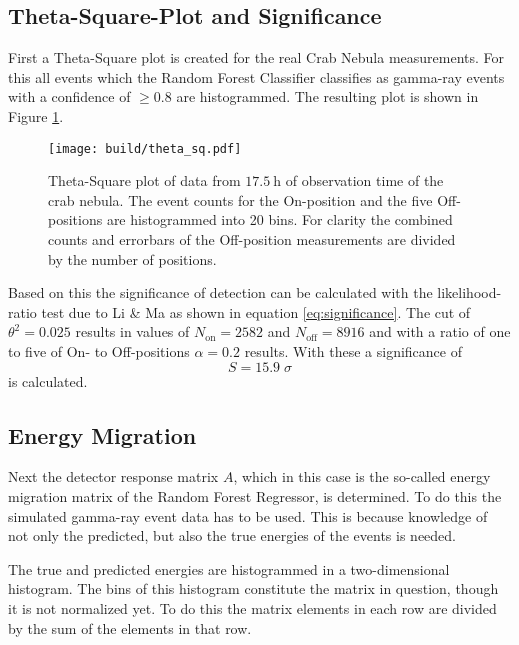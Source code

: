         \subsection{Theta-Square-Plot and Significance}
            First a Theta-Square plot is created for the real Crab Nebula measurements.
            For this all events which the Random Forest Classifier classifies as gamma-ray events with a confidence of $\geq \num{0.8}$ are histogrammed.
            The resulting plot is shown in Figure \ref{fig:theta_sq}.
            \begin{figure}
                \centering
                \texttt{[image: build/theta\_sq.pdf]}
                \caption{
                    Theta-Square plot of data from $\SI{17.5}{\hour}$ of observation time of the crab nebula.
                    The event counts for the On-position and the five Off-positions are histogrammed into 20 bins.
                    For clarity the combined counts and errorbars of the Off-position measurements are divided by the number of positions.
                }
                \label{fig:theta_sq}
            \end{figure}
            
            Based on this the significance of detection can be calculated with the likelihood-ratio test due to Li \& Ma \cite{} as shown in equation \eqref{eq:significance}.
            The cut of $\theta^2 = \num{0.025}$ results in values of $N_\text{on} = 2582$ and $N_\text{off} = 8916$ and with a ratio of one to five of On- to Off-positions $\alpha = \num{0.2}$ results.
            With these a significance of
            \begin{equation}
                S = \num{15.9} \; \sigma
            \end{equation}
            is calculated.
            

        
        \subsection{Energy Migration}
            Next the detector response matrix $A$, which in this case is the so-called energy migration matrix of the Random Forest Regressor, is determined.
            To do this the simulated gamma-ray event data has to be used.
            This is because knowledge of not only the predicted, but also the true energies of the events is needed.
            
            The true and predicted energies are histogrammed in a two-dimensional histogram.
            The bins of this histogram constitute the matrix in question, though it is not normalized yet.
            To do this the matrix elements in each row are divided by the sum of the elements in that row.

